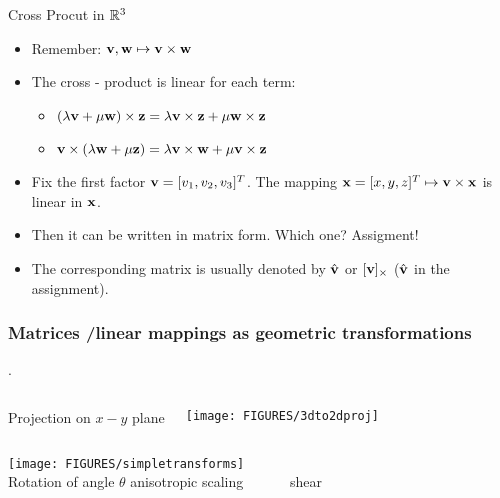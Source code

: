 \documentclass[8pt,dvipsnames]{beamer}
\begin{document}
\begin{frame}{Cross Procut in ${\mathbb R}^3$}
  \begin{itemize}
  \item Remember: ${\bf v},{\bf w}\mapsto {\bf v}\times {\bf w}$\vfill
  \item The cross - product is linear for each term:
    \begin{itemize}
    \item $(\lambda{\bf v} + \mu{\bf w})\times {\bf z} = \lambda{\bf v}\times {\bf z} + \mu{\bf w}\times {\bf z}$
    \item ${\bf v} \times(\lambda{\bf w} + \mu{\bf z}) = \lambda{\bf v}\times {\bf w} + \mu{\bf v}\times {\bf z}$
    \end{itemize}\vfill
  \item Fix the first factor ${\bf v} =  [v_1,v_2,v_3]^T$. The mapping ${\bf x} = [x,y,z]^T\mapsto {\bf v}\times{\bf x}$ is linear in ${\bf x}$.\vfill
  \item Then it can be written in matrix form. Which one? Assigment!\vfill
  \item The corresponding matrix is usually denoted by $\hat{{\bf v}}$ or $[{\bf v}]_\times$ ($\hat{{\bf v}}$ in the assignment).
  \end{itemize}
\end{frame}

\begin{frame}
  \frametitle{Matrices /linear mappings as geometric transformations}. 
  \begin{columns}
    \begin{center}
    Projection  on $x-y$ plane
    \end{center}
    \texttt{[image: FIGURES/3dto2dproj]}
  \end{columns}
  \begin{center}
    \texttt{[image: FIGURES/simpletransforms]}\\
    Rotation of angle $\theta$ \hfill anisotropic scaling \hfill ~~~~~~shear~~~~~~~~~~~
  \end{center}
\end{frame}
\end{document}
